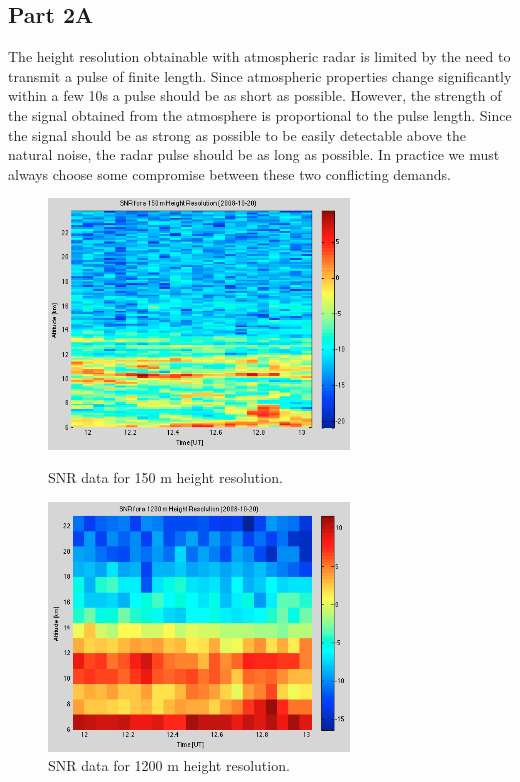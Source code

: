 \documentclass{article}
\begin{document}
\subsection{Part 2A}

The height resolution obtainable with atmospheric radar is limited by the need to transmit a pulse of finite length. Since atmospheric properties change significantly within a few 10s a pulse should be as short as possible. However, the strength of the signal obtained from the atmosphere is proportional to the pulse length. Since the signal should be as strong as possible to be easily detectable above the natural noise, the radar pulse should be as long as possible. In practice we must always choose some compromise between these two conflicting demands. \cite{Enmark:2012a2}


\begin{figure}[htb]
\begin{minipage}[t]{0.5\linewidth}
\centering
\includegraphics[width=8cm]{Figures/height_res_150m.png}
\caption{SNR data for 150 m height resolution.}
\label{fig:height_res_150m}
\end{minipage}
\begin{minipage}[t]{0.5\linewidth}
\centering
\includegraphics[width=8cm]{Figures/height_res_1200m.png}
\caption{SNR data for 1200 m height resolution.}
\label{fig:height_res_1200m}
\end{minipage}
\end{figure}
\end{document}
